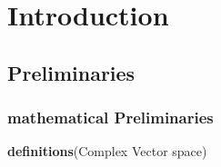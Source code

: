 \chapter{Introduction}

%
%
%

\section{ Preliminaries }

\subsection{ mathematical Preliminaries }

 \textbf{definitions}{(Complex Vector space)}


